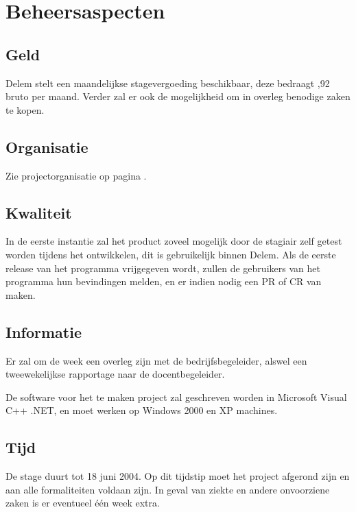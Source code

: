 \section{Beheersaspecten}

\subsection{Geld}

Delem stelt een maandelijkse stagevergoeding beschikbaar, deze bedraagt ,92 bruto per maand. Verder zal er ook de mogelijkheid om in overleg benodige zaken te kopen.

\subsection{Organisatie}

Zie projectorganisatie op pagina \pageref{organisatie}.

\subsection{Kwaliteit}

In de eerste instantie zal het product zoveel mogelijk door de stagiair zelf getest worden tijdens het ontwikkelen, dit is gebruikelijk binnen Delem. Als de eerste release van het programma vrijgegeven wordt, zullen de gebruikers van het programma hun bevindingen melden, en er indien nodig een PR of CR van maken.

\subsection{Informatie}

Er zal om de week een overleg zijn met de bedrijfsbegeleider, alswel een tweewekelijkse rapportage naar de docentbegeleider.

De software voor het te maken project zal geschreven worden in Microsoft Visual C++ .NET, en moet werken op Windows 2000 en XP machines.

\subsection{Tijd}

De stage duurt tot 18 juni 2004. Op dit tijdstip moet het project afgerond zijn en aan alle formaliteiten voldaan zijn. In geval van ziekte en andere onvoorziene zaken is er eventueel \'e\'en week extra.

